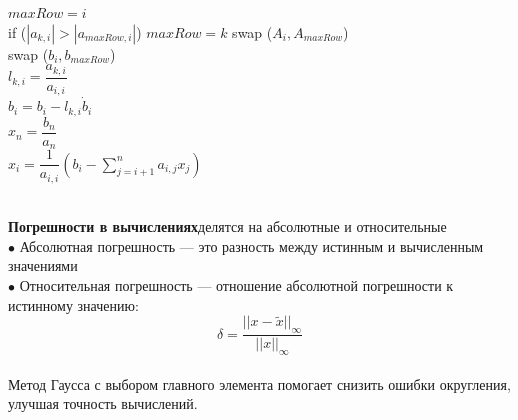 \documentclass[a4paper, 12pt]{report}
\begin{document}
   \begin{algorithm}
        {
       $maxRow = i$\\
        {
       if ($|a_{k,i}| > |a_{maxRow,i}|$) $maxRow = k$
       }
       swap ($A_{i}, A_{maxRow}$)\\
       swap ($b_{i}, b_{maxRow}$)\\
        {
       $l_{k,i} = \dfrac{a_{k,i}}{a_{i,i}}$\\
       $b_{i} = b_{i} - l_{k,i} \dot b_{i}$\\
       }
       }
       $x_{n} = \dfrac{b_{n}}{a_{n}}$\\
        {
       $x_{i} = \dfrac{1}{a_{i,i}} (b_{i} - \sum_{j = i + 1}^{n} a_{i,j}x_{j})$\\\\
       }
   \end{algorithm}
   \textbf{Погрешности в вычислениях}делятся на абсолютные и относительные\\
   $\bullet$ Абсолютная погрешность — это разность между истинным и вычисленным значениями\\
   $\bullet$ Относительная погрешность — отношение абсолютной погрешности к истинному значению:$$\delta =  \dfrac {||x - \tilde{x}||_{\infty}}{||x||_{\infty}}$$\\
   Метод Гаусса с выбором главного элемента помогает снизить ошибки округления, улучшая точность вычислений.\\
\end{document}
